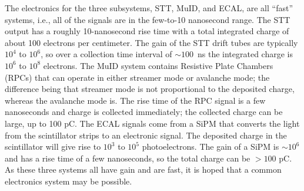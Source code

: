 The electronics for the three subsystems, STT, MuID, and ECAL, are all ``fast'' systems, 
i.e., all of the signals are %
in the few-to-10 nanosecond range.  The STT output has 
a roughly 10-nanosecond rise time with a total integrated charge of about 100 
electrons per centimeter.  The gain of the STT drift tubes are typically $10^4$ to $10^6$, 
so over a collection time interval of $\sim100$~ns
the integrated charge is  $10^6$ to $10^8$ electrons. 
The MuID system contains Resistive Plate Chambers (RPCs) that can operate 
in either streamer mode or avalanche mode; the difference 
being that streamer mode is not proportional to 
the deposited charge, whereas the avalanche mode 
is.  The rise time of the RPC signal is a few nanoseconds and charge is 
collected immediately; the collected charge can be large, up to 100 pC.  The ECAL 
signals come from a SiPM that converts the light from the 
scintillator strips to an electronic signal. The deposited charge in the scintillator 
will give rise to $10^3$ to $10^5$ photoelectrons.  The gain of a SiPM is $\sim10^6$ and 
has a rise time of a few nanoseconds, so the total charge can be $>100$ pC. As these 
three systems all have gain and are fast, it is hoped that a 
common electronics system may be possible. 

